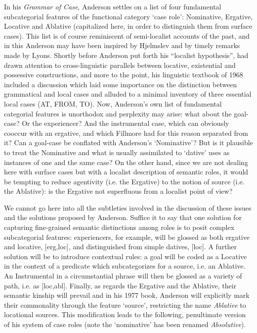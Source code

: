\documentclass[output=paper]{langscibook}
\begin{document}
In his \textit{Grammar of Case}, Anderson settles on a list of four fundamental subcategorial features of the functional category ‘case role’: Nominative, Ergative, Locative and Ablative (capitalized here, in order to distinguish them from surface cases). This list is of course reminiscent of semi-localist accounts of the past, and in this Anderson may have been inspired by Hjelmslev and by timely remarks made by Lyons. Shortly before Anderson put forth his “localist hypothesis”, \citet{lyons_note_1967} had drawn attention to cross-linguistic parallels between locative, existential and possessive constructions, and more to the point, his linguistic textbook of 1968 included a discussion which laid some importance on the distinction between grammatical and local cases and alluded to a minimal inventory of three essential local cases (AT, FROM, TO). Now, Anderson’s own list of fundamental categorial features is unorthodox and perplexity may arise: what about the goal-case? Or the experiencer? And the instrumental case, which can obviously cooccur with an ergative, and which Fillmore had for this reason separated from it? Can a goal-case be conflated with Anderson’s ‘Nominative’? But is it plausible to treat the Nominative and what is usually assimilated to ‘dative’ uses as instances of one and the same case? On the other hand, since we are not dealing here with surface cases but with a localist description of semantic roles, it would be tempting to reduce agentivity (i.e. the Ergative) to the notion of source (i.e. the Ablative): is the Ergative not superfluous from a localist point of view?

We cannot go here into all the subtleties involved in the discussion of these issues and the solutions proposed by Anderson. Suffice it to say that one solution for capturing fine-grained semantic distinctions among roles is to posit complex subcategorial features: experiencers, for example, will be glossed as both ergative and locative, [erg,loc], and distinguished from simple datives, [loc]. A further solution will be to introduce contextual rules: a goal will be coded as a Locative in the context of a predicate which subcategorizes for a source, i.e. an Ablative. An Instrumental in a circumstantial phrase will then be glossed as a variety of path, i.e. as [loc,abl]. Finally, as regards the Ergative and the Ablative, their semantic kinship will prevail and in his 1977 book, Anderson will explicitly mark their commonality through the feature ‘source’, restricting the name \textit{Ablative} to locational sources. This modification leads to the following, penultimate version of his system of case roles (note the ‘nominative’ has been renamed \textit{Absolutive}).
\end{document}
